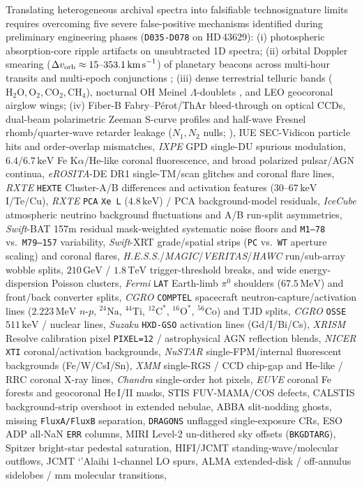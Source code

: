 \documentclass[twocolumn,10pt]{article}
\begin{document}
Translating heterogeneous archival spectra into falsifiable technosignature limits requires overcoming five severe false-positive mechanisms identified during preliminary engineering phases (\texttt{D035-D078} on HD\,43629): (i) photospheric absorption-core ripple artifacts on unsubtracted 1D spectra; (ii) orbital Doppler smearing ($\Delta v_{\mathrm{orb}} \approx 15\text{--}353.1\,\text{km\,s}^{-1}$) of planetary beacons across multi-hour transits and multi-epoch conjunctions \cite{KippingTeachey2016,Sheikh2020}; (iii) dense terrestrial telluric bands ($\mathrm{H_2O, O_2, CO_2, CH_4}$), nocturnal OH Meinel $\Lambda$-doublets \cite{Rousselot2000,Oliva2015}, and LEO geocoronal airglow wings; (iv) Fiber-B Fabry--P\'{e}rot/ThAr bleed-through on optical CCDs, dual-beam polarimetric Zeeman S-curve profiles and half-wave Fresnel rhomb/quarter-wave retarder leakage ($N_1, N_2$ nulls; \cite{Donati1997,Auriere2003}), IUE SEC-Vidicon particle hits and order-overlap mismatches, \textit{IXPE} GPD single-DU spurious modulation, $6.4/6.7\,\mathrm{keV}$ Fe K$\alpha$/He-like coronal fluorescence, and broad polarized pulsar/AGN continua, \textit{eROSITA}-DE DR1 single-TM/scan glitches and coronal flare lines, \textit{RXTE} \texttt{HEXTE} Cluster-A/B differences and activation features ($30\text{--}67\,\mathrm{keV}$ I/Te/Cu), \textit{RXTE} \texttt{PCA} \texttt{Xe L} ($4.8\,\mathrm{keV}$) / PCA background-model residuals, \textit{IceCube} atmospheric neutrino background fluctuations and A/B run-split asymmetries, \textit{Swift}-BAT 157m residual mask-weighted systematic noise floors and \texttt{M1--78} vs.\ \texttt{M79--157} variability, \textit{Swift}-XRT grade/spatial strips (\texttt{PC} vs.\ \texttt{WT} aperture scaling) and coronal flares, \textit{H.E.S.S.}/\textit{MAGIC}/\textit{VERITAS}/\textit{HAWC} run/sub-array wobble splits, $210\,\mathrm{GeV}$ / $1.8\,\mathrm{TeV}$ trigger-threshold breaks, and wide energy-dispersion Poisson clusters, \textit{Fermi} \texttt{LAT} Earth-limb $\pi^0$ shoulders ($67.5\,\mathrm{MeV}$) and front/back converter splits, \textit{CGRO} \texttt{COMPTEL} spacecraft neutron-capture/activation lines ($2.223\,\mathrm{MeV}$ $n$-$p$, $^{24}\mathrm{Na}$, $^{44}\mathrm{Ti}$, $^{12}\mathrm{C}^\ast$, $^{16}\mathrm{O}^\ast$, $^{56}\mathrm{Co}$) and TJD splits, \textit{CGRO} \texttt{OSSE} $511\,\mathrm{keV}$ / nuclear lines, \textit{Suzaku} \texttt{HXD-GSO} activation lines (Gd/I/Bi/Cs), \textit{XRISM} Resolve calibration pixel \texttt{PIXEL=12} / astrophysical AGN reflection blends, \textit{NICER} \texttt{XTI} coronal/activation backgrounds, \textit{NuSTAR} single-FPM/internal fluorescent backgrounds (Fe/W/CsI/Sn), \textit{XMM} single-RGS / CCD chip-gap and He-like / RRC coronal X-ray lines, \textit{Chandra} single-order hot pixels, \textit{EUVE} coronal Fe forests and geocoronal He\,I/II masks, STIS FUV-MAMA/COS defects, CALSTIS background-strip overshoot in extended nebulae, ABBA slit-nodding ghosts, missing \texttt{FluxA/FluxB} separation, \texttt{DRAGONS} unflagged single-exposure CRs, ESO ADP all-NaN \texttt{ERR} columns, MIRI Level-2 un-dithered sky offsets (\texttt{BKGDTARG}), Spitzer bright-star pedestal saturation, HIFI/JCMT standing-wave/molecular outflows, JCMT `'Alaihi 1-channel LO spurs, ALMA extended-disk / off-annulus sidelobes / mm molecular transitions, 
\end{document}
